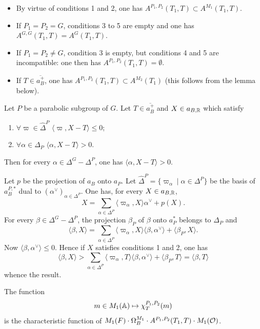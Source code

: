 \begin{paragr}
\begin{remarque}\label{rem:APP}
\leavevmode
\begin{itemize}
\item[--] By virtue of conditions 1 and 2, one has $A^{P_1,P_2}(T_1,T)\subset A^{M_1}(T_1,T)$.
\item[--] If $P_1=P_2=G$, conditions 3 to 5 are empty and one has $A^{G,G}(T_1,T)=A^G(T_1,T)$.
\item[--] If $P_1=P_2\neq G$, condition 3 is empty, but conditions 4 and 5 are incompatible: one then has $A^{P_1,P_2}(T_1,T)=\emptyset$.
\item[--] If $T\in \overline{a_B^+}$, one has $A^{P_1,P_2}(T_1,T)\subset A^{M_2}(T_1)$ (this follows from the lemma below).
\end{itemize}
\end{remarque}

\begin{lemme}\label{lem:cone}
Let $P$ be a parabolic subgroup of $G$. Let $T\in \overline{a_B^+}$ and $X\in a_{B,\mathbb{R}}$ which satisfy
\begin{enumerate}
\item $\forall \varpi\in \hat{\Delta}^P$ \quad $\langle \varpi,X-T\rangle \leq 0$;
\item $\forall \alpha\in \Delta_P$ \quad $\langle \alpha,X-T\rangle >0$.
\end{enumerate}
Then for every $\alpha\in \Delta^G-\Delta^P$, one has $\langle \alpha,X-T\rangle >0$.
\end{lemme}

\begin{preuve}
Let $p$ be the projection of $a_B$ onto $a_P$. Let $\hat{\Delta}^P=\{\varpi_\alpha\mid \alpha\in \Delta^P\}$ be the basis of $a_B^{P,*}$ dual to $(\alpha^\vee)_{\alpha\in \Delta^P}$. One has, for every $X\in a_{B,\mathbb{R}}$,
$$X=\sum_{\alpha\in \Delta^P} \langle \varpi_\alpha,X\rangle \alpha^\vee+p(X).$$
For every $\beta\in \Delta^G-\Delta^P$, the projection $\beta_P$ of $\beta$ onto $a_P^*$ belongs to $\Delta_P$ and
$$\langle \beta,X\rangle =\sum_{\alpha\in \Delta^P} \langle \varpi_\alpha,X\rangle \langle \beta,\alpha^\vee\rangle+\langle \beta_P,X\rangle.$$
Now $\langle \beta,\alpha^\vee\rangle \leq 0$. Hence if $X$ satisfies conditions 1 and 2, one has
$$\langle \beta,X\rangle >\sum_{\alpha\in \Delta^P} \langle \varpi_\alpha,T\rangle \langle \beta,\alpha^\vee\rangle+\langle \beta_P,T\rangle=\langle \beta,T\rangle$$
whence the result.
\end{preuve}

\begin{lemme}[Arthur]\label{lem:chiT}
The function
$$m\in M_1(\mathbb{A})\mapsto \chi_T^{P_1,P_2}(m)$$
is the characteristic function of $M_1(F)\cdot \Omega_B^{M_1}\cdot A^{P_1,P_2}(T_1,T)\cdot M_1(\mathcal{O})$.
\end{lemme}


\end{paragr}
